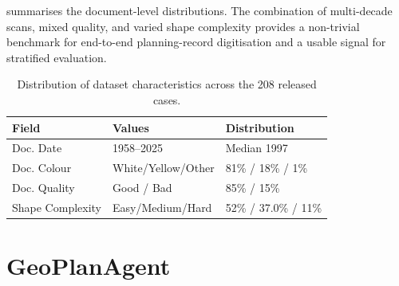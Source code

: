 \documentclass[11pt]{article}
\begin{document}
 summarises the document-level distributions. The combination of multi-decade scans, mixed quality, and varied shape complexity provides a non-trivial benchmark for end-to-end planning-record digitisation and a usable signal for stratified evaluation.
 
\begin{table}[t]
\centering
\setlength{\tabcolsep}{1.5pt}
\small
\caption{Distribution of dataset characteristics across the 208 released cases.}
\label{tab:data-characteristics}
\begin{tabular}{@{}lll@{}}
\toprule
\textbf{Field} & \textbf{Values} & \textbf{Distribution} \\
\midrule
Doc. Date     & 1958--2025         & Median 1997 \\
Doc. Colour   & White/Yellow/Other & 81\% / 18\% / 1\% \\
Doc. Quality  & Good / Bad         & 85\% / 15\% \\
Shape Complexity & Easy/Medium/Hard & 52\% / 37.0\% / 11\% \\
\bottomrule
\end{tabular}
\label{tab:data-characteristics}
\end{table}

 



\section{GeoPlanAgent}
\label{section:geoplanagent}


\end{document}
